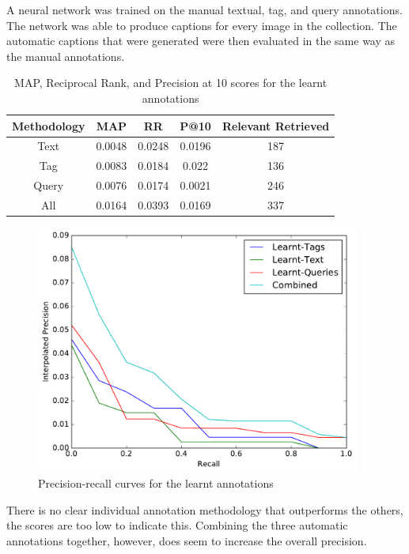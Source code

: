 \FloatBarrier

A neural network was trained on the manual textual, tag, and query annotations. The network was able to produce captions for every image in the collection. The automatic captions that were generated were then evaluated in the same way as the manual annotations. 

\begin{table}[h]
    \centering
    \begin{tabular}{|c|c|c|c|c|}
        \hline
         Methodology & MAP & RR & P@10 & Relevant Retrieved\\ \hline
         Text & 0.0048 & 0.0248 & 0.0196 & 187 \\ \hline
         Tag & 0.0083 & 0.0184 & 0.022 & 136 \\ \hline
         Query & 0.0076 & 0.0174 & 0.0021 & 246 \\ \hline
         All & 0.0164 & 0.0393 & 0.0169 & 337 \\ \hline
    \end{tabular}
    \caption{MAP, Reciprocal Rank, and Precision at 10 scores for the learnt annotations}
    \label{table:learnt-results}
\end{table}

\begin{figure}[h]
    \centering
    \includegraphics[width=0.95\textwidth]{graphs/learnt-result}
    \caption{Precision-recall curves for the learnt annotations}
    \label{fig:manual-result}
\end{figure}

\FloatBarrier
There is no clear individual annotation methodology that outperforms the others, the scores are too low to indicate this. Combining the three automatic annotations together, however, does seem to increase the overall precision.

